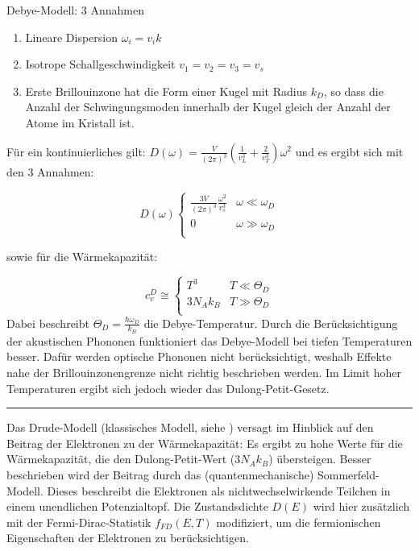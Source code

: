 Debye-Modell: 3 Annahmen

\begin{enumerate}
    \item Lineare Dispersion $\omega_i = v_i k$
    \item Isotrope Schallgeschwindigkeit $v_1 = v_2 = v_3 = v_s$
    \item Erste Brillouinzone hat die Form einer Kugel mit Radius $k_D$, so dass die Anzahl der Schwingungsmoden innerhalb der Kugel gleich der Anzahl der Atome im Kristall ist.     
\end{enumerate}

Für ein kontinuierliches gilt: $D(\omega) = \frac{V}{(2\pi)^3} \left( \frac{1}{v_L^3} + \frac{2}{v_T^3}\right) \omega^2$ und es ergibt sich mit den 3 Annahmen:

\[ D(\omega) \left\{ \begin{array}{ll}
    \frac{3V}{(2\pi)^3} \frac{\omega^2}{v_s^3} & \omega \ll \omega_D \\
    0  & \omega \gg \omega_D \\
    \end{array} \right.
\] 

sowie für die Wärmekapazität:

\[ c_v^D \cong \left\{ \begin{array}{ll}
    T^3 & T \ll \Theta_D \\
    3N_Ak_B  & T \gg \Theta_D \\
    \end{array} \right.
\] 
Dabei beschreibt $\Theta_D = \frac{\hbar \omega_D}{k_B}$ die Debye-Temperatur.
Durch die Berücksichtigung der akustischen Phononen funktioniert das Debye-Modell bei tiefen Temperaturen besser. Dafür werden optische Phononen nicht berücksichtigt, weshalb Effekte nahe der Brillouinzonengrenze nicht richtig beschrieben werden. Im Limit hoher Temperaturen ergibt sich jedoch wieder das Dulong-Petit-Gesetz.

\vspace{.2cm}
\hrule
\vspace{.2cm}
 
\label{q:58}

Das Drude-Modell (klassisches Modell, siehe ) versagt im Hinblick auf den Beitrag der Elektronen zu der Wärmekapazität: Es ergibt zu hohe Werte für die Wärmekapazität, die den Dulong-Petit-Wert ($3N_Ak_B$) übersteigen. Besser beschrieben wird der Beitrag durch das (quantenmechanische) Sommerfeld-Modell. Dieses beschreibt die Elektronen als nichtwechselwirkende Teilchen in einem unendlichen Potenzialtopf. Die Zustandsdichte $D(E)$ wird hier zusätzlich mit der Fermi-Dirac-Statistik $f_{FD} (E, T)$ modifiziert, um die fermionischen Eigenschaften der Elektronen zu berücksichtigen.

